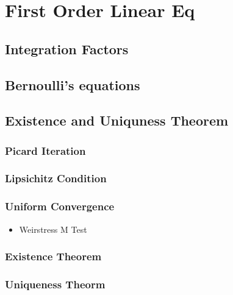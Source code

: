 \documentclass[11pt]{article}
\begin{document}
\section{First Order Linear Eq}
\label{sec-7}

\subsection{Integration Factors}
\label{sec-7.1}

\subsection{Bernoulli's equations}
\label{sec-7.2}

\subsection{Existence and Uniquness Theorem}
\label{sec-7.3}

\subsubsection{Picard Iteration}
\label{sec-7.3.1}

\subsubsection{Lipsichitz Condition}
\label{sec-7.3.2}

\subsubsection{Uniform Convergence}
\label{sec-7.3.3}

\begin{itemize}

\item Weirstress M Test\\
\label{sec-7.3.3.1}

\end{itemize} %
\subsubsection{Existence Theorem}
\label{sec-7.3.4}

\subsubsection{Uniqueness Theorm}
\label{sec-7.3.5}
\end{document}
